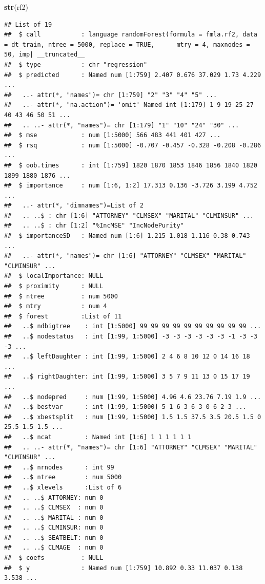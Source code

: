\documentclass[]{book}
\newenvironment{Shaded}{\begin{snugshade}}{\end{snugshade}}
\newcommand{\KeywordTok}[1]{\textcolor[rgb]{0.13,0.29,0.53}{\textbf{#1}}}
\newcommand{\NormalTok}[1]{#1}
\begin{document}
\begin{Shaded}
\begin{Highlighting}[]
\KeywordTok{str}\NormalTok{(rf2)}
\end{Highlighting}
\end{Shaded}

\begin{verbatim}
## List of 19
##  $ call           : language randomForest(formula = fmla.rf2, data = dt_train, ntree = 5000, replace = TRUE,      mtry = 4, maxnodes = 50, imp| __truncated__
##  $ type           : chr "regression"
##  $ predicted      : Named num [1:759] 2.407 0.676 37.029 1.73 4.229 ...
##   ..- attr(*, "names")= chr [1:759] "2" "3" "4" "5" ...
##   ..- attr(*, "na.action")= 'omit' Named int [1:179] 1 9 19 25 27 40 43 46 50 51 ...
##   .. ..- attr(*, "names")= chr [1:179] "1" "10" "24" "30" ...
##  $ mse            : num [1:5000] 566 483 441 401 427 ...
##  $ rsq            : num [1:5000] -0.707 -0.457 -0.328 -0.208 -0.286 ...
##  $ oob.times      : int [1:759] 1820 1870 1853 1846 1856 1840 1820 1899 1880 1876 ...
##  $ importance     : num [1:6, 1:2] 17.313 0.136 -3.726 3.199 4.752 ...
##   ..- attr(*, "dimnames")=List of 2
##   .. ..$ : chr [1:6] "ATTORNEY" "CLMSEX" "MARITAL" "CLMINSUR" ...
##   .. ..$ : chr [1:2] "%IncMSE" "IncNodePurity"
##  $ importanceSD   : Named num [1:6] 1.215 1.018 1.116 0.38 0.743 ...
##   ..- attr(*, "names")= chr [1:6] "ATTORNEY" "CLMSEX" "MARITAL" "CLMINSUR" ...
##  $ localImportance: NULL
##  $ proximity      : NULL
##  $ ntree          : num 5000
##  $ mtry           : num 4
##  $ forest         :List of 11
##   ..$ ndbigtree    : int [1:5000] 99 99 99 99 99 99 99 99 99 99 ...
##   ..$ nodestatus   : int [1:99, 1:5000] -3 -3 -3 -3 -3 -3 -1 -3 -3 -3 ...
##   ..$ leftDaughter : int [1:99, 1:5000] 2 4 6 8 10 12 0 14 16 18 ...
##   ..$ rightDaughter: int [1:99, 1:5000] 3 5 7 9 11 13 0 15 17 19 ...
##   ..$ nodepred     : num [1:99, 1:5000] 4.96 4.6 23.76 7.19 1.9 ...
##   ..$ bestvar      : int [1:99, 1:5000] 5 1 6 3 6 3 0 6 2 3 ...
##   ..$ xbestsplit   : num [1:99, 1:5000] 1.5 1.5 37.5 3.5 20.5 1.5 0 25.5 1.5 1.5 ...
##   ..$ ncat         : Named int [1:6] 1 1 1 1 1 1
##   .. ..- attr(*, "names")= chr [1:6] "ATTORNEY" "CLMSEX" "MARITAL" "CLMINSUR" ...
##   ..$ nrnodes      : int 99
##   ..$ ntree        : num 5000
##   ..$ xlevels      :List of 6
##   .. ..$ ATTORNEY: num 0
##   .. ..$ CLMSEX  : num 0
##   .. ..$ MARITAL : num 0
##   .. ..$ CLMINSUR: num 0
##   .. ..$ SEATBELT: num 0
##   .. ..$ CLMAGE  : num 0
##  $ coefs          : NULL
##  $ y              : Named num [1:759] 10.892 0.33 11.037 0.138 3.538 ...

\end{verbatim}
\end{document}
